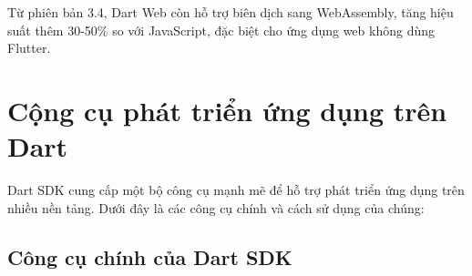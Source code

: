 \documentclass[../DoAn.tex]{subfiles}
\numberwithin{figure}{chapter}
\begin{document}
Từ phiên bản 3.4, Dart Web còn hỗ trợ biên dịch sang WebAssembly, tăng hiệu suất thêm 30-50\% so với JavaScript, đặc biệt cho ứng dụng web không dùng Flutter.

\section{Cộng cụ phát triển ứng dụng trên Dart}

Dart SDK cung cấp một bộ công cụ mạnh mẽ để hỗ trợ phát triển ứng dụng trên nhiều nền tảng. Dưới đây là các công cụ chính và cách sử dụng của chúng:

\subsection{Công cụ chính của Dart SDK}
\end{document}
